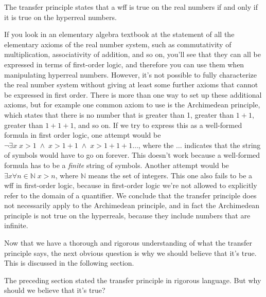 The transfer principle states that a wff is true on the real numbers if and only if it is true on the hyperreal numbers.

If you look in an elementary algebra textbook at  the statement of all the elementary axioms of the real number system, such
as commutativity of multiplication, associativity of addition, and so on, you'll see that they can all
be expressed in terms of first-order logic, and therefore you can use them when manipulating hyperreal numbers.
However, it's not possible to fully characterize the real number system without giving at least some further
axioms that cannot be expressed in first order. There is more than one way to set up these additional axioms,
but for example one common axiom to use is the Archimedean principle,
which states that there is no number that is greater than 1, greater than $1+1$, greater than $1+1+1$, and so on.
If we try to express this as a well-formed formula in first order logic, one attempt would be
$\neg \exists x \; x>1 \;\wedge\; x>1+1  \;\wedge\; x>1+1+1 \ldots$, where the $\dots$ indicates that the string of
symbols would have to go on forever. This doesn't work because a well-formed formula has to be a \emph{finite}
string of symbols. Another attempt would be $\exists x \forall n \in \mathbb{N} \; x>n$, where $\mathbb{N}$ means
the set of integers. This one also fails to be a wff in first-order logic, because in first-order logic
we're not allowed to explicitly refer to the domain of a quantifier. We conclude that the transfer principle
does not necessarily apply to the Archimedean principle, and in fact the Archimedean principle is not
true on the hyperreals, because they include numbers that are infinite.

Now that we have a thorough and rigorous understanding of what the transfer principle says, the next obvious
question is why we should believe that it's true. This is discussed in the following section.


The preceding section stated the transfer principle in rigorous language. But why should we believe that it's
true?


